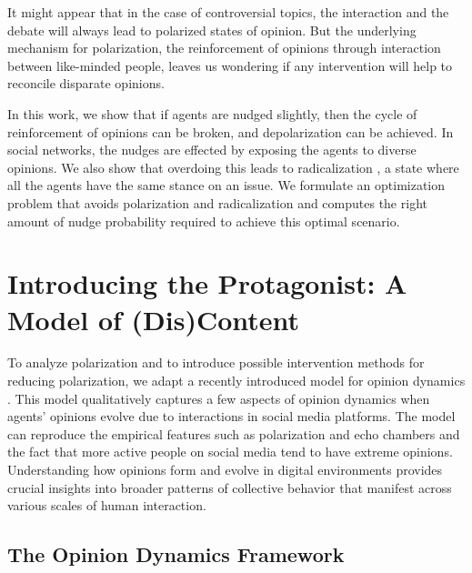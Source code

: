 It might appear that in the case of controversial topics, the interaction and the debate will always lead to polarized states of opinion. But the underlying mechanism for polarization, the reinforcement of opinions through interaction between like-minded people, leaves us wondering if any intervention will help to reconcile disparate opinions.

In this work, we show that if agents are nudged slightly, then the cycle of reinforcement of opinions can be broken, and depolarization can be achieved. In social networks, the nudges are effected by exposing the agents to diverse opinions. We also show that overdoing this leads to radicalization \cite{the-group-polarization-phemomenon, group-polarization-a-critical-review-and-meta-analysis}, a state where all the agents have the same stance on an issue. We formulate an optimization problem that avoids polarization and radicalization and computes the right amount of nudge probability required to achieve this optimal scenario.

\section{Introducing the Protagonist: A Model of (Dis)Content}

To analyze polarization and to introduce possible intervention methods for reducing polarization, we adapt a recently introduced model for opinion dynamics \cite{modeling-echo-chambers-and-polarizaiton-dynamics-in-social-networks}. This model qualitatively captures a few aspects of opinion dynamics when agents' opinions evolve due to interactions in social media platforms. The model can reproduce the empirical features such as polarization and echo chambers and the fact that more active people on social media tend to have extreme opinions. Understanding how opinions form and evolve in digital environments provides crucial insights into broader patterns of collective behavior that manifest across various scales of human interaction.

\subsection{The Opinion Dynamics Framework}

